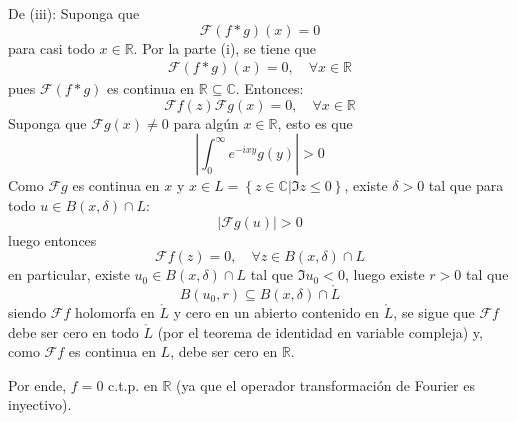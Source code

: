 \documentclass[12pt]{report}
\newcounter{it}
\theoremstyle{largebreak}
\renewcommand{\leq}{\ensuremath{\leqslant}}
\newcommand\abs[1]{\ensuremath{\left|#1\right|}}
\newcommand{\fou}[1]{\ensuremath{\mathcal{F}#1}}
\begin{document}
\begin{sol}
        De (iii): Suponga que
        \begin{equation*}
            \fou{(f*g)}(x)=0
        \end{equation*}
        para casi todo $x\in\mathbb{R}$. Por la parte (i), se tiene que
        \begin{equation*}
            \begin{split}
                \fou{(f*g)}(x)=0,\quad\forall x\in\mathbb{R}
            \end{split}
        \end{equation*}
        pues $\fou{(f*g)}$ es continua en $\mathbb{R}\subseteq\mathbb{C}$. Entonces:
        \begin{equation*}
            \fou{f}(z)\fou{g}(x)=0,\quad\forall x\in\mathbb{R}
        \end{equation*}
        Suponga que $\fou{g}(x)\neq0$ para algún $x\in\mathbb{R}$, esto es que
        \begin{equation*}
            \abs{\int_{ 0}^\infty e^{ -ixy}g(y)}>0
        \end{equation*}
        Como $\fou{g}$ es continua en $x$ y $x\in L=\left\{z\in\mathbb{C}\Big|\Im z\leq0 \right\}$, existe $\delta>0$ tal que para todo $u\in B(x,\delta)\cap L$:
        \begin{equation*}
            \abs{\fou{g}(u)}>0
        \end{equation*}
        luego entonces
        \begin{equation*}
            \fou{f}(z)=0,\quad\forall z\in B(x,\delta)\cap L
        \end{equation*}
        en particular, existe $u_0\in B(x,\delta)\cap L$ tal que $\Im u_0<0$, luego existe $r>0$ tal que
        \begin{equation*}
            B(u_0,r)\subseteq B(x,\delta)\cap \mathring{L}
        \end{equation*}
        siendo $\fou{f}$ holomorfa en $\mathring{L}$ y cero en un abierto contenido en $\mathring{L}$, se sigue que $\fou{f}$ debe ser cero en todo $\mathring{L}$ (por el teorema de identidad en variable compleja) y, como $\fou{f}$ es continua en $L$, debe ser cero en $\mathbb{R}$.

        Por ende, $f=0$ c.t.p. en $\mathbb{R}$ (ya que el operador transformación de Fourier es inyectivo).
    \end{sol}
\end{document}

